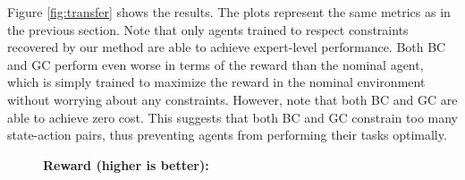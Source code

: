 \documentclass{article}
\begin{document}
Figure \ref{fig:transfer} shows the results. The plots represent the same metrics as in the previous section. Note that only agents trained to respect constraints recovered by our method are able to achieve expert-level performance. Both BC and GC perform even worse in terms of the reward than the nominal agent, which is simply trained to maximize the reward in the nominal environment without worrying about any constraints. However, note that both BC and GC are able to achieve zero cost. This suggests that both BC and GC constrain too many state-action pairs, thus preventing agents from performing their tasks optimally.

\begin{figure}[h!]
\vskip 0.2in
\begin{center}
    \small{\bfseries Reward (higher is better):}\\
    \\

\end{center}
\end{figure}
\end{document}
